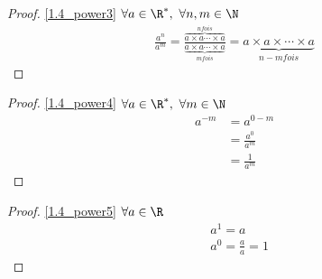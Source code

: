 \begin{proof}
	\ref{1.4_power3} $\forall a \in \R^*,\ \forall n, m \in \N$
	\begin{align*}
		\frac{a^n}{a^m} = \frac{\overbrace{a \times a \cdots \times a}^{n fois}}{\underbrace{a \times a \cdots \times a}_{m fois}} = \underbrace{a \times a \times \cdots \times a}_{n - m fois}
	\end{align*}
\end{proof}

\begin{proof}
	\ref{1.4_power4} $\forall a \in \R^*,\ \forall m \in \N$
	\begin{align*}
		a^{-m} &= a^{0 - m}  \\
		&= \frac{a^0}{a^m} \\
		&= \frac{1}{a^m}
	\end{align*}
\end{proof}

\begin{proof}
	\ref{1.4_power5} $\forall a \in \R$
	\begin{align*}
		&a^1 = a \\
		&a^0 = \frac{a}{a} = 1
	\end{align*}
\end{proof}
